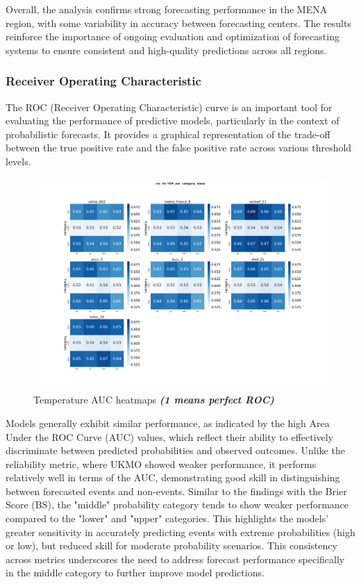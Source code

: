 Overall, the analysis confirms strong forecasting performance in the MENA region, with some variability in accuracy between forecasting centers. The results reinforce the importance of ongoing evaluation and optimization of forecasting systems to ensure consistent and high-quality predictions across all regions.

\subsubsection{Receiver Operating Characteristic}

The ROC (Receiver Operating Characteristic) curve is an important tool for evaluating the performance of predictive models, particularly in the context of probabilistic forecasts. It provides a graphical representation of the trade-off between the true positive rate  and the false positive rate  across various threshold levels.

\begin{figure}[H]
    \centering
    \includegraphics[width=1\linewidth]{plots/prob/roc/roc_T2M_category_mena.png}
    \caption{Temperature AUC  heatmaps \textbf{\textit{(1 means perfect ROC)}}}
\end{figure}


Models generally exhibit similar performance, as indicated by the high Area Under the ROC Curve (AUC) values, which reflect their ability to effectively discriminate between predicted probabilities and observed outcomes. Unlike the reliability metric, where UKMO showed weaker performance, it performs relatively well in terms of the AUC, demonstrating good skill in distinguishing between forecasted events and non-events. Similar to the findings with the Brier Score (BS), the "middle" probability category tends to show weaker performance compared to the "lower" and "upper" categories. This highlights the models' greater sensitivity in accurately predicting events with extreme probabilities (high or low), but reduced skill for moderate probability scenarios. This consistency across metrics underscores the need to address forecast performance specifically in the middle category to further improve model predictions.



